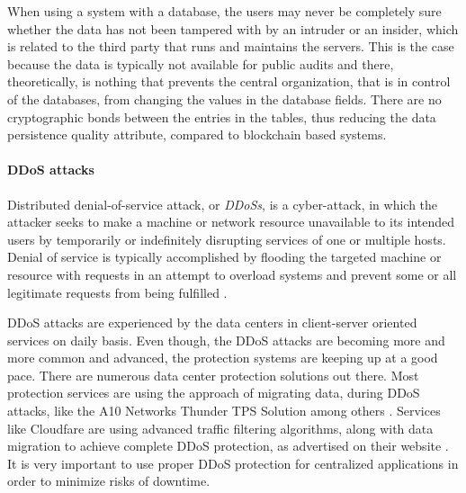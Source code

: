 When using a system with a database, the users may never be completely sure whether the data has not been tampered with by an intruder or an insider, which is related to the third party that runs and maintains the servers. This is the case because the data is typically not available for public audits and there, theoretically, is nothing that prevents the central organization, that is in control of the databases, from changing the values in the database fields. There are no cryptographic bonds between the entries in the tables, thus reducing the data persistence quality attribute, compared to blockchain based systems.

\paragraph{DDoS attacks}
Distributed denial-of-service attack, or \textit{\glspl{DDoS}}, is a cyber-attack, in which the attacker seeks to make a machine or network resource unavailable to its intended users by temporarily or indefinitely disrupting services of one or multiple hosts. Denial of service is typically accomplished by flooding the targeted machine or resource with requests in an attempt to overload systems and prevent some or all legitimate requests from being fulfilled \citep{ddos}.

DDoS attacks are experienced by the data centers in client-server oriented services on daily basis. Even though, the DDoS attacks are becoming more and more common and advanced, the protection systems are keeping up at a good pace. There are numerous data center protection solutions out there. Most protection services are using the approach of migrating data, during DDoS attacks, like the A10 Networks Thunder TPS Solution among others \citep{a10networks}. Services like Cloudfare are using advanced traffic filtering algorithms, along with data migration to achieve complete DDoS protection, as advertised on their website \citep{cloudfare}. It is very important to use proper DDoS protection for centralized applications in order to minimize risks of downtime.

